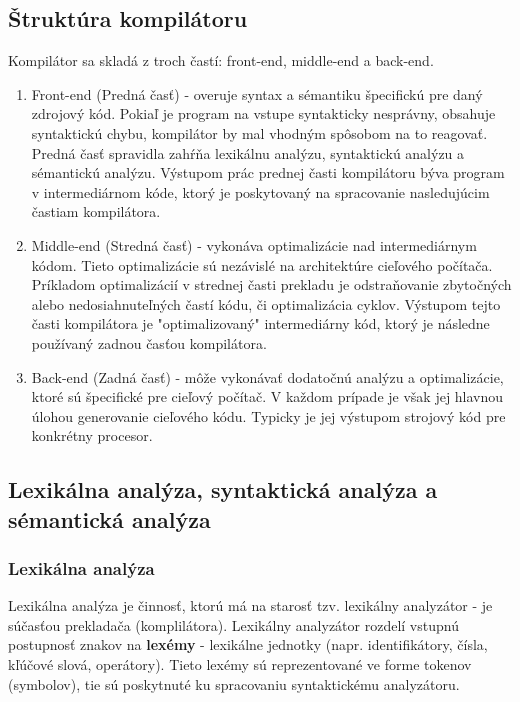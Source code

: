 \subsection{Štruktúra kompilátoru}
Kompilátor sa skladá z troch častí: front-end, middle-end a back-end.

\begin{enumerate}
	\item Front-end (Predná časť) - overuje syntax a sémantiku špecifickú pre daný zdrojový kód. 
	Pokiaľ je program na vstupe syntakticky nesprávny, obsahuje syntaktickú chybu, 
	kompilátor by mal vhodným spôsobom na to reagovať. 
	Predná časť spravidla zahŕňa lexikálnu analýzu, syntaktickú analýzu a sémantickú analýzu.
	Výstupom prác prednej časti kompilátoru býva program v intermediárnom kóde, 
	ktorý je poskytovaný na spracovanie nasledujúcim častiam kompilátora.

	\item Middle-end (Stredná časť) - vykonáva optimalizácie nad intermediárnym kódom. 
	Tieto optimalizácie sú nezávislé na architektúre cieľového počítača. 
	Príkladom optimalizácií v strednej časti prekladu je odstraňovanie zbytočných 
	alebo nedosiahnuteľných častí kódu, či optimalizácia cyklov. Výstupom tejto časti kompilátora 
	je "optimalizovaný" intermediárny kód, ktorý je následne používaný zadnou časťou kompilátora.

	\item Back-end (Zadná časť) -  môže vykonávať dodatočnú analýzu a optimalizácie, 
	ktoré sú špecifické pre cieľový počítač. V každom prípade je však jej hlavnou úlohou 
	generovanie cieľového kódu. Typicky je jej výstupom strojový kód pre konkrétny procesor.
\end{enumerate}

\subsection{Lexikálna analýza, syntaktická analýza a sémantická analýza}

\subsubsection{Lexikálna analýza}
Lexikálna analýza je činnosť, ktorú má na starosť tzv. lexikálny analyzátor - 
je súčasťou prekladača (komplilátora). Lexikálny analyzátor rozdelí vstupnú postupnosť znakov na \textbf{lexémy} 
- lexikálne jednotky (napr. identifikátory, čísla, kľúčové slová, operátory). 
Tieto lexémy sú reprezentované ve forme tokenov (symbolov), tie sú poskytnuté 
ku spracovaniu syntaktickému analyzátoru.

